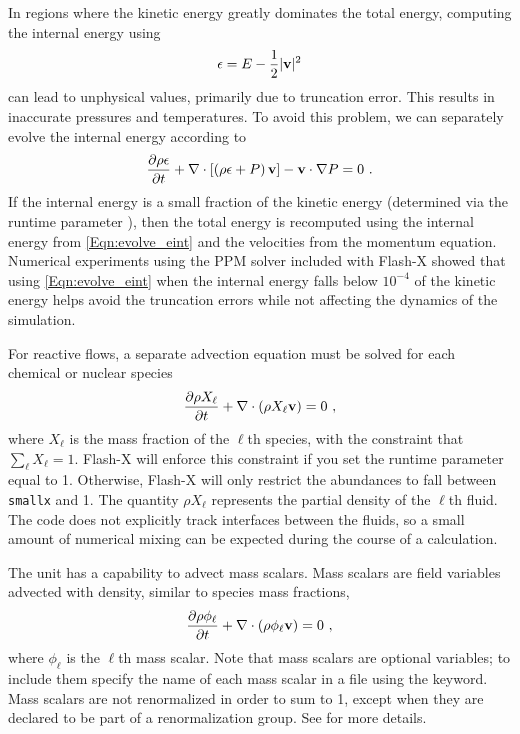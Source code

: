 In regions where the kinetic energy greatly dominates the
total energy, computing the internal energy using
\begin{equation}
\label{Eqn:intener} \epsilon = E - \frac{1}{2}|{\bf v}|^2
\end{equation}
can lead to unphysical values, primarily due to truncation error.
This results in inaccurate pressures and temperatures.  To avoid this
problem, we can separately evolve the internal energy according to
\begin{equation}
\label{Eqn:evolve_eint}
   \frac{\partial \rho \epsilon}{\partial t}
   + \nabla \cdot \left [ \left (\rho \epsilon + P \right){\bf v} \right ]
   - {\bf v}\cdot \nabla P = 0\ .
\end{equation}
If the internal energy is a small fraction of the kinetic energy
(determined via the runtime parameter ), then the
total energy is recomputed using the internal energy from
\eqref{Eqn:evolve_eint} and the velocities from the momentum
equation. Numerical experiments using the PPM solver included with
Flash-X showed that using \eqref{Eqn:evolve_eint} when the internal
energy falls below $10^{-4}$ of the kinetic energy helps avoid the
truncation errors while not affecting the dynamics of the
simulation.

For reactive flows, a separate advection equation must be solved
for each chemical or nuclear species
\begin{equation}
{{\partial \rho X_\ell} \over {\partial t}}
+ {\bf \nabla} \cdot \left ( \rho X_\ell {\bf v} \right ) = 0\ ,
\end{equation}
where $X_\ell$ is the mass fraction of the $\ell$th species, with
the constraint that $\sum_\ell X_\ell = 1$.  Flash-X will enforce this
constraint if you set the runtime parameter  equal to
1. Otherwise, Flash-X will only restrict the abundances to fall
between \texttt{smallx} and 1. The quantity $\rho X_\ell$ represents
the partial density of the $\ell$th fluid. The code does not
explicitly track interfaces between the fluids, so a small amount of
numerical mixing can be expected during the course of a calculation.

The  unit has a capability to advect mass scalars.  
Mass scalars are field variables advected with density, similar to
species mass fractions,
\begin{equation}
\label{eq:massscalar}
{{\partial \rho \phi_\ell} \over {\partial t}}
+ {\bf \nabla} \cdot \left ( \rho \phi_\ell {\bf v} \right ) = 0\ ,
\end{equation}
where $\phi_\ell$ is the $\ell$th mass scalar. 
Note that mass scalars are optional variables; to include them
specify the name of each mass scalar in a 
file using the  keyword.  
Mass scalars 
are not renormalized in order to sum to
1, except when they are declared to be part of a renormalization group.
See 
for more details.

